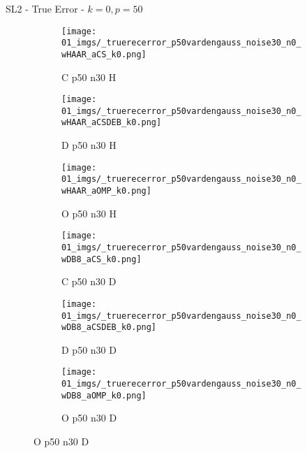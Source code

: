 \begin{frame}{SL2 - True Error - $k=0,p=50$}{}
\begin{figure}
\vspace{5pt}

\begin{subfigure}{0.13\textwidth}
\texttt{[image: 01\_imgs/\_truerecerror\_p50vardengauss\_noise30\_n0\_wHAAR\_aCS\_k0.png]}
\caption*{\tiny C p50 n30 H}
\end{subfigure}
\begin{subfigure}{0.13\textwidth}
\texttt{[image: 01\_imgs/\_truerecerror\_p50vardengauss\_noise30\_n0\_wHAAR\_aCSDEB\_k0.png]}
\caption*{\tiny D p50 n30 H}
\end{subfigure}
\begin{subfigure}{0.13\textwidth}
\texttt{[image: 01\_imgs/\_truerecerror\_p50vardengauss\_noise30\_n0\_wHAAR\_aOMP\_k0.png]}
\caption*{\tiny O p50 n30 H}
\end{subfigure}
\begin{subfigure}{0.13\textwidth}
\texttt{[image: 01\_imgs/\_truerecerror\_p50vardengauss\_noise30\_n0\_wDB8\_aCS\_k0.png]}
\caption*{\tiny C p50 n30 D}
\end{subfigure}
\begin{subfigure}{0.13\textwidth}
\texttt{[image: 01\_imgs/\_truerecerror\_p50vardengauss\_noise30\_n0\_wDB8\_aCSDEB\_k0.png]}
\caption*{\tiny D p50 n30 D}
\end{subfigure}
\begin{subfigure}{0.13\textwidth}
\texttt{[image: 01\_imgs/\_truerecerror\_p50vardengauss\_noise30\_n0\_wDB8\_aOMP\_k0.png]}
\caption*{\tiny O p50 n30 D}
\end{subfigure}
\end{figure}
\end{frame}


